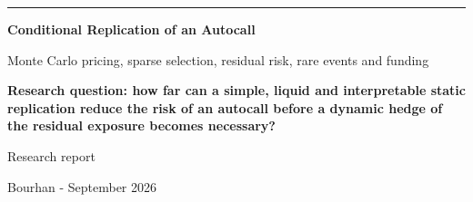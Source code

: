 \documentclass[11pt,a4paper]{article}
\newcommand{\HRule}{\color{blue}\rule{\linewidth}{1.8pt}}
\newcommand{\important}[1]{\par\noindent\colorbox{pale}{\parbox{0.96\linewidth}{\color{navy}\textbf{#1}}}\par}
\begin{document}
\begin{titlepage}
\thispagestyle{empty}
\vspace*{20mm}
\HRule
\vspace{20mm}
{\fontsize{27}{33}\selectfont\bfseries\color{navy}
Conditional Replication of an Autocall}

\vspace{7mm}
{\Large\color{muted}
Monte Carlo pricing, sparse selection, residual risk, rare events and funding}

\vspace{18mm}
\important{Research question: how far can a simple, liquid and interpretable static replication reduce the risk of an autocall before a dynamic hedge of the residual exposure becomes necessary?}

\vfill
\begin{center}
{\large\color{navy}Research report}\par
\vspace{2mm}
{\color{muted}Bourhan - September 2026}
\end{center}
\end{titlepage}
\end{document}
